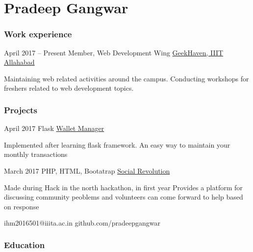 \documentclass{tccv}
\begin{document}
\part{Pradeep Gangwar}

\section{Work experience}

\begin{eventlist}

\item{April 2017 -- Present}
     {Member, Web Development Wing}
     {\href{https://geekhaven.iiita.ac.in}{GeekHaven, IIIT Allahabad}}

Maintaining web related activities around the campus. Conducting workshops for freshers related to web development topics.

\end{eventlist}

\section{Projects}

\begin{eventlist}

\item{April 2017}
	{Flask}
    {\href{https://github.com/pradeepgangwar/Wallet-Manager}{Wallet Manager}}

Implemented after learning flask framework.\newline
An easy way to maintain your monthly transactions

\item{March 2017}
     {PHP, HTML, Bootatrap}
     {\href{https://github.com/pradeepgangwar/SocialRevolution}{Social Revolution}}
     
Made during Hack in the north hackathon, in first year\newline
Provides a platform for discussing community peoblems and volunteers can come forward to help based on response

\end{eventlist}

    {ihm2016501@iiita.ac.in}
    {github.com/pradeepgangwar}

\section{Education}
\end{document}
